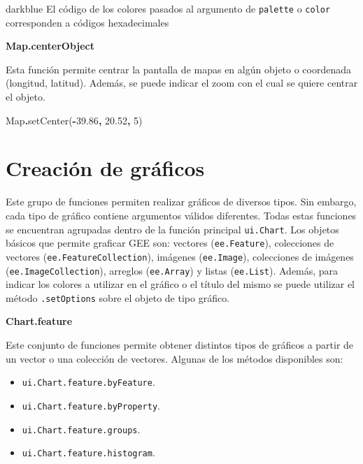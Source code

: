 \documentclass[
  12pt,
  letterpaper,
  twoside]{book}
\newenvironment{Shaded}{\begin{snugshade}}{\end{snugshade}}
\newcommand{\BuiltInTok}[1]{#1}
\newcommand{\DecValTok}[1]{\textcolor[rgb]{0.00,0.00,0.81}{#1}}
\newcommand{\FloatTok}[1]{\textcolor[rgb]{0.00,0.00,0.81}{#1}}
\newcommand{\FunctionTok}[1]{\textcolor[rgb]{0.00,0.00,0.00}{#1}}
\newcommand{\NormalTok}[1]{#1}
\newcommand{\OperatorTok}[1]{\textcolor[rgb]{0.81,0.36,0.00}{\textbf{#1}}}
\providecommand{\tightlist}{%
  \setlength{\itemsep}{0pt}\setlength{\parskip}{0pt}}
\begin{document}
\begin{bluebox2}

\begin{awesomeblock}{5pt}{\faLightbulb}{darkblue}
El código de los colores pasados al argumento de \texttt{palette} o \texttt{color} corresponden a códigos hexadecimales

\end{awesomeblock}

\end{bluebox2}

\textbf{Map.centerObject}

Esta función permite centrar la pantalla de mapas en algún objeto o coordenada (longitud, latitud). Además, se puede indicar el zoom con el cual se quiere centrar el objeto.

\begin{Shaded}
\begin{Highlighting}[]
\BuiltInTok{Map}\OperatorTok{.}\FunctionTok{setCenter}\NormalTok{(}\OperatorTok{{-}}\FloatTok{39.86}\OperatorTok{,} \FloatTok{20.52}\OperatorTok{,} \DecValTok{5}\NormalTok{)}
\end{Highlighting}
\end{Shaded}

\hypertarget{creaciuxf3n-de-gruxe1ficos}{%
\section{Creación de gráficos}\label{creaciuxf3n-de-gruxe1ficos}}

Este grupo de funciones permiten realizar gráficos de diversos tipos. Sin embargo, cada tipo de gráfico contiene argumentos válidos diferentes. Todas estas funciones se encuentran agrupadas dentro de la función principal \texttt{ui.Chart}. Los objetos básicos que permite graficar GEE son: vectores (\texttt{ee.Feature}), colecciones de vectores (\texttt{ee.FeatureCollection}), imágenes (\texttt{ee.Image}), colecciones de imágenes (\texttt{ee.ImageCollection}), arreglos (\texttt{ee.Array}) y listas (\texttt{ee.List}). Además, para indicar los colores a utilizar en el gráfico o el título del mismo se puede utilizar el método \texttt{.setOptions} sobre el objeto de tipo gráfico.

\textbf{Chart.feature}

Este conjunto de funciones permite obtener distintos tipos de gráficos a partir de un vector o una colección de vectores. Algunas de los métodos disponibles son:

\begin{itemize}
\tightlist
\item
  \texttt{ui.Chart.feature.byFeature}.
\item
  \texttt{ui.Chart.feature.byProperty}.
\item
  \texttt{ui.Chart.feature.groups}.
\item
  \texttt{ui.Chart.feature.histogram}.
\end{itemize}
\end{document}
